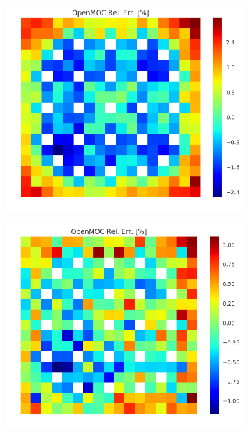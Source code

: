 \begin{figure}[h!]
\centering
\begin{subfigure}{.33\textwidth}
  \centering
  \includegraphics[width=\linewidth]{figures/quantification/assm-16/infinite-fiss-err-2}
  \caption{}
  \label{fig:chap8-assm-1.6-inf-fiss-2}
\end{subfigure}%
\begin{subfigure}{.33\textwidth}
  \centering
  \includegraphics[width=\linewidth]{figures/quantification/assm-16/infinite-fiss-err-8}

\end{subfigure}
\end{figure}
